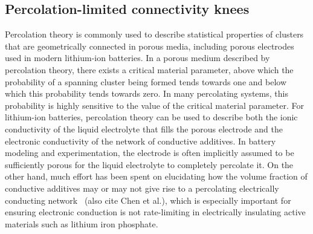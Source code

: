 \documentclass[journal=jpcl, manuscript=article, layout=onecolumn]{achemso}
\begin{document}
\subsection{Percolation-limited connectivity knees}

Percolation theory \cite{essam_percolation_1980, stauffer_introduction_1994} is commonly used to describe statistical properties of clusters that are geometrically connected in porous media, including porous electrodes used in modern lithium-ion batteries\cite{ferguson_nonequilibrium_2012}. In a porous medium described by percolation theory, there exists a critical material parameter, above which the probability of a spanning cluster being formed tends towards one and below which this probability tends towards zero.\cite{ferguson_nonequilibrium_2012} In many percolating systems, this probability is highly sensitive to the value of the critical material parameter. For lithium-ion batteries, percolation theory can be used to describe both the ionic conductivity of the liquid electrolyte that fills the porous electrode and the electronic conductivity of the network of conductive additives. In battery modeling and experimentation, the electrode is often implicitly assumed to be sufficiently porous for the liquid electrolyte to completely percolate it. On the other hand, much effort has been spent on elucidating how the volume fraction of conductive additives may or may not give rise to a percolating electrically conducting network~\cite{li_effects_2015, cerbelaud_understanding_2015, guzman_improved_2017} (also cite Chen et al.), which is especially important for ensuring electronic conduction is not rate-limiting in electrically insulating active materials such as lithium iron phosphate.\cite{li_effects_2015, guzman_improved_2017}
\end{document}
